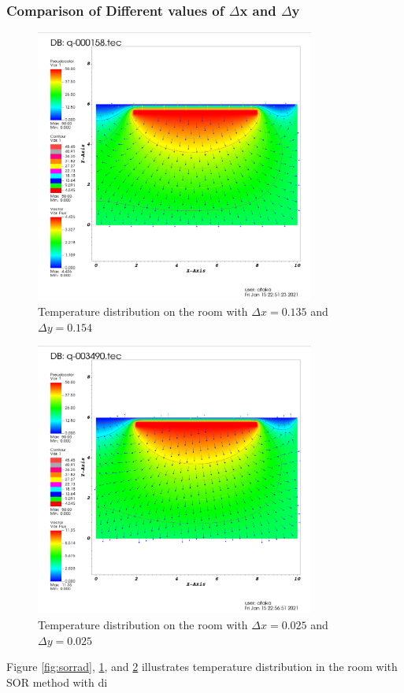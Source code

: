\documentclass[letterpaper,12pt]{article}
\begin{document}
\subsubsection{Comparison of Different values of $\Delta$x and $\Delta$y}
\begin{figure}[H] 
	\centering 
	\includegraphics[max height=9cm]{graphs/imax75jmax40_default/imax75jmax40_default.png}
	\caption{Temperature distribution on the room with $\Delta x=0.135$ and $\Delta y = 0.154$}
 	\label{fig:7540}
\end{figure}
\begin{figure}[H] 
	\centering 
	\includegraphics[max height=9cm]{graphs/imax402jmax242_default/imax402jmax242_default.png}
	\caption{Temperature distribution on the room with $\Delta x=0.025$ and $\Delta y = 0.025$}
 	\label{fig:402242}
\end{figure}
Figure \ref{fig:sorrad}, \ref{fig:7540}, and \ref{fig:402242} illustrates temperature
distribution in the room with SOR method with di
\end{document}
